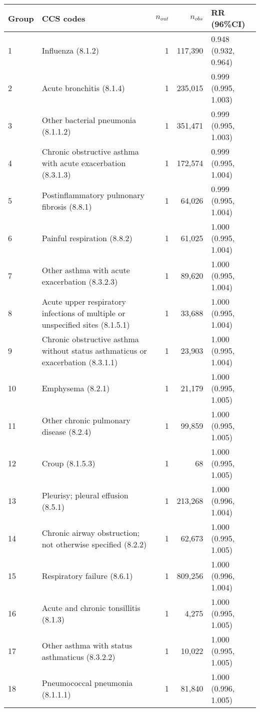 \begin{tabular}{lp{6.5cm}rrp{2.2cm}}
  \hline
Group & CCS codes & $n_{out}$ & $n_{obs}$ & RR (96\%CI) \\ 
  \hline
   1 & Influenza (8.1.2) &    1 & 117,390 & 0.948 (0.932, 0.964) \\ 
     2 & Acute bronchitis (8.1.4) &    1 & 235,015 & 0.999 (0.995, 1.003) \\ 
     3 & Other bacterial pneumonia (8.1.1.2) &    1 & 351,471 & 0.999 (0.995, 1.003) \\ 
     4 & Chronic obstructive asthma with acute exacerbation (8.3.1.3) &    1 & 172,574 & 0.999 (0.995, 1.004) \\ 
     5 & Postinflammatory pulmonary fibrosis (8.8.1) &    1 & 64,026 & 0.999 (0.995, 1.004) \\ 
     6 & Painful respiration (8.8.2) &    1 & 61,025 & 1.000 (0.995, 1.004) \\ 
     7 & Other asthma with acute exacerbation (8.3.2.3) &    1 & 89,620 & 1.000 (0.995, 1.004) \\ 
     8 & Acute upper respiratory infections of multiple or unspecified sites (8.1.5.1) &    1 & 33,688 & 1.000 (0.995, 1.004) \\ 
     9 & Chronic obstructive asthma without status asthmaticus or exacerbation (8.3.1.1) &    1 & 23,903 & 1.000 (0.995, 1.004) \\ 
    10 & Emphysema (8.2.1) &    1 & 21,179 & 1.000 (0.995, 1.005) \\ 
    11 & Other chronic pulmonary disease (8.2.4) &    1 & 99,859 & 1.000 (0.995, 1.005) \\ 
    12 & Croup (8.1.5.3) &    1 & 68 & 1.000 (0.995, 1.005) \\ 
    13 & Pleurisy; pleural effusion (8.5.1) &    1 & 213,268 & 1.000 (0.996, 1.004) \\ 
    14 & Chronic airway obstruction; not otherwise specified (8.2.2) &    1 & 62,673 & 1.000 (0.995, 1.005) \\ 
    15 & Respiratory failure (8.6.1) &    1 & 809,256 & 1.000 (0.996, 1.004) \\ 
    16 & Acute and chronic tonsillitis (8.1.3) &    1 & 4,275 & 1.000 (0.995, 1.005) \\ 
    17 & Other asthma with status asthmaticus (8.3.2.2) &    1 & 10,022 & 1.000 (0.995, 1.005) \\ 
    18 & Pneumococcal pneumonia (8.1.1.1) &    1 & 81,840 & 1.000 (0.996, 1.005) \\ 

\end{tabular}
